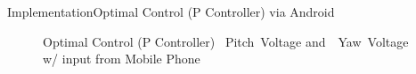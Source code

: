 \documentclass{beamer}
\begin{document}
%
\begin{frame}{Implementation}{Optimal Control (P Controller) via Android}
    \begin{figure}
      \centering
      \caption{Optimal Control (P Controller) ~Pitch~Voltage and~~Yaw~Voltage w/ input from Mobile Phone}
      \label{fig:LQR_Volt}
    \end{figure}
\end{frame}
\end{document}
